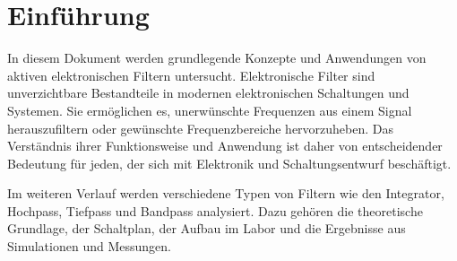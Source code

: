 %
\section{Einführung}

In diesem Dokument werden grundlegende Konzepte und Anwendungen von aktiven elektronischen Filtern untersucht. Elektronische Filter sind unverzichtbare Bestandteile in modernen elektronischen Schaltungen und Systemen. Sie ermöglichen es, unerwünschte Frequenzen aus einem Signal herauszufiltern oder gewünschte Frequenzbereiche hervorzuheben. Das Verständnis ihrer Funktionsweise und Anwendung ist daher von entscheidender Bedeutung für jeden, der sich mit Elektronik und Schaltungsentwurf beschäftigt.

Im weiteren Verlauf werden verschiedene Typen von Filtern wie den Integrator, Hochpass, Tiefpass und Bandpass analysiert. Dazu gehören die theoretische Grundlage, der Schaltplan, der Aufbau im Labor und die Ergebnisse aus Simulationen und Messungen.

